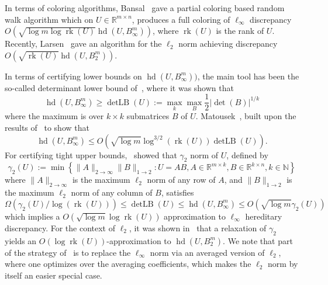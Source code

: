 \documentclass[11pt]{article}
\newcommand{\R}{{\mathbb{R}}}
\newcommand{\N}{{\mathbb{N}}}
\newcommand{\set}[1]{\left\{ #1 \right\}}
\DeclareMathOperator{\detlb}{detLB}
\DeclareMathOperator{\hd}{hd}
\DeclareMathOperator{\rank}{rk}
\begin{document}
In terms of coloring algorithms, Bansal~\cite{Bansal10} gave a partial coloring
based random walk algorithm which on $U \in \R^{m \times n}$, produces a full
coloring of $\ell_\infty$ discrepancy $O(\sqrt{\log m \log \rank(U)}
\hd(U,B_\infty^m))$, where $\rank(U)$ is the rank of $U$. Recently,
Larsen~\cite{Larsen17} gave an algorithm for the $\ell_2$ norm achieving
discrepancy $O(\sqrt{\rank(U)}\hd(U,B_2^m))$. 

In terms of certifying lower bounds on $\hd(U,B_\infty^m))$, the main tool has
been the so-called determinant lower bound of~\cite{LSV}, where it was shown that
\[
\hd(U,B_\infty^m) \geq \detlb(U) := \max_k \max_B \frac{1}{2}|\det(B)|^{1/k}
\]       
where the maximum is over $k \times k$ submatrices $B$ of $U$.
Matousek~\cite{Matousek11}, built upon the results of~\cite{Bansal10} to show that 
\[
\hd(U,B_\infty^m) \leq O(\sqrt{\log m} \log^{3/2}(\rank(U)) \detlb(U)).
\]
For certifying tight upper bounds,~\cite{NT15,disc-gamma2} showed that
$\gamma_2$ norm of $U$, defined by 
\[
\gamma_2(U) := \min \set{\|A\|_{2 \rightarrow \infty} \|B\|_{1 \rightarrow 2}: U
= A B, A \in \R^{m \times k}, B \in \R^{k \times n}, k \in \N}  
\]
where $\|A\|_{2 \rightarrow \infty}$ is the maximum $\ell_2$ norm of any row of $A$,
and $\|B\|_{1 \rightarrow 2}$ is the maximum $\ell_2$ norm of any column of $B$,
satisfies
\begin{equation}
\Omega(\gamma_2(U)/\log(\rank(U))) \leq \detlb(U) \leq \hd(U,B_\infty^m) \leq O(\sqrt{\log m} \gamma_2(U)) 
\end{equation}
which implies a $O(\sqrt{\log m} \log \rank(U))$ approximation to $\ell_\infty$
hereditary discrepancy. For the context of $\ell_2$, it was shown in~\cite{NT15}
that a relaxation of $\gamma_2$ yields an $O(\log \rank(U))$-approximation to
$\hd(U,B_2^m)$. We note that part of the strategy of~\cite{NT15,disc-gamma2}
is to replace the $\ell_\infty$ norm via an averaged version of $\ell_2$, where
one optimizes over the averaging coefficients, which makes the $\ell_2$ norm by
itself an easier special case.
\end{document}

